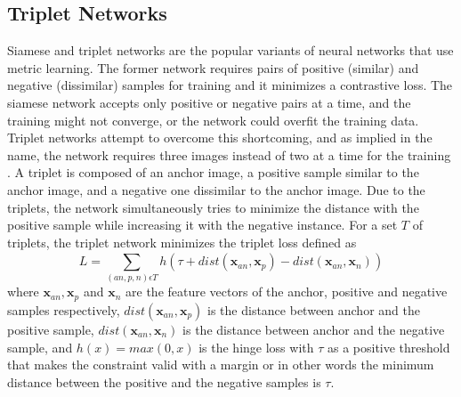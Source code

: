 

\subsection{Triplet Networks}

Siamese and triplet networks are the popular variants of neural networks that use metric learning. The former network requires pairs of positive (similar) and negative (dissimilar) samples for training and it minimizes a contrastive loss. The siamese network accepts only positive or negative pairs at a time, and the training might not converge, or the network could overfit the training data. Triplet networks attempt to overcome this shortcoming, and as implied in the name, the network requires three images instead of two at a time for the training \cite{Schroff2015FaceNetAU}. A triplet is composed of an anchor image, a positive sample similar to the anchor image, and a negative one dissimilar to the anchor image. Due to the triplets, the network simultaneously tries to minimize the distance with the positive sample while increasing it with the negative instance. For a set \begin{math} T \end{math} of triplets, the triplet network minimizes the triplet loss \cite{Lu2017DeepML} defined as 
\begin{equation}\label{triplet_loss}
L = \sum_{(an, p, n) \epsilon T}^{}h(\tau + dist(\pmb{x}_{an}, \pmb{x}_{p}) - dist(\pmb{x}_{an}, \pmb{x}_{n}))
\end{equation} 
where \begin{math} \pmb{x}_{an}, \pmb{x}_{p} \end{math} and \begin{math} \pmb{x}_{n} \end{math} are the feature vectors of the anchor, positive and negative samples respectively, \begin{math} dist(\pmb{x}_{an}, \pmb{x}_{p}) \end{math} is the distance between anchor and the positive sample, \begin{math} dist(\pmb{x}_{an}, \pmb{x}_{n}) \end{math} is the distance between anchor and the negative sample, and \begin{math} h(x) = max(0, x) \end{math} is the hinge loss with \begin{math} \tau \end{math} as a positive threshold that makes the constraint valid with a margin or in other words the minimum distance between the positive and the negative samples is \begin{math} \tau \end{math}.

